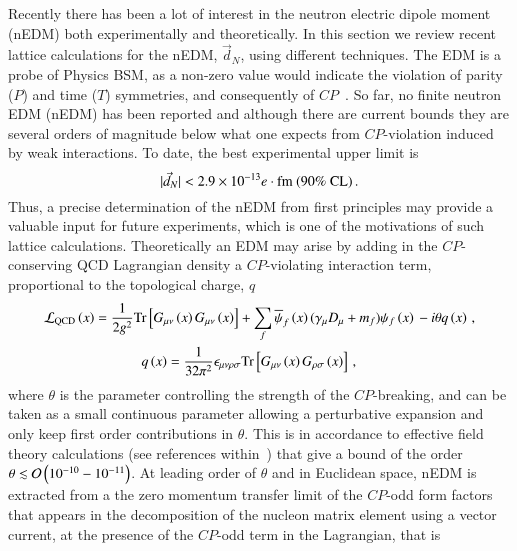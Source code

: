 \documentclass[epj]{webofc}
\newcommand{\be}{\begin{equation}}
\newcommand{\ee}{\end{equation}}
\newcommand{\bea}{\begin{eqnarray}}
\newcommand{\eea}{\end{eqnarray}}
\begin{document}
Recently there has been a lot of interest in the neutron electric dipole moment (nEDM)
both experimentally and theoretically. In this section we review recent lattice calculations for the nEDM,
$\vec{d}_N$, using different techniques. The EDM is a probe of Physics BSM, as a non-zero value would indicate the violation of parity
($P$) and time ($T$) symmetries, and consequently of $CP$~\cite{Pospelov:2005pr}. So far, no finite neutron EDM (nEDM) has been
reported and although there are current bounds they are several orders of magnitude
below what one expects from $CP$-violation induced by weak interactions. To date, the best experimental upper limit 
is~\cite{Helaine:2014ona,Baker:2006ts,Baker:2007df}
\be
\vert \vec{d}_N \vert  < 2.9 \times 10^{-13} e \cdot {\rm fm} \ (90\% \ {\rm CL})\,.
\label{eq:nEDM_smaller_experimental_upperbound}
\ee 
Thus, a precise determination of the nEDM from first principles may provide a valuable input for future experiments, which is one
of the motivations of such lattice calculations. Theoretically an EDM may arise by adding in the $CP$-conserving QCD Lagrangian density 
a $CP$-violating interaction term, proportional to the topological charge, $q$
\bea
  {\cal L}_{\rm QCD} \left( x \right) = \frac{1}{2 g^2} 
{\rm Tr} \left[ G_{\mu \nu} \left( x \right) G_{\mu \nu} \left( x \right) \right] + 
\sum_{f} {\overline \psi}_{f} \left( x \right) (\gamma_{\mu} D_{\mu} +m_f) \psi_{f}\left( x \right)\,
- i \theta q \left( x \right)\,,\\
  q \left( x \right) = \frac{1}{ 32 \pi^2} \epsilon_{\mu \nu \rho \sigma} 
{\rm Tr} \left[ G_{\mu \nu} \left( x \right) G_{\rho \sigma} \left( x \right) \right]\,,\hspace*{3cm}
\eea
where $\theta$ is the parameter controlling the strength of the $CP$-breaking, and can be taken as a small continuous
parameter allowing a perturbative expansion and only keep first order contributions in $\theta$. This is in accordance to effective
field theory calculations (see references within~\cite{Alexandrou:2015spa})
that give a bound of the order 
$\theta \lesssim {\cal O} \left(10^{-10} - 10^{-11} \right)$.
%
At leading order of  $\theta$ and in Euclidean space, nEDM is extracted from a
the zero momentum transfer limit of the $CP$-odd form factors that appears in the
decomposition of the nucleon matrix element using a vector current, at the presence of the
$CP$-odd term in the Lagrangian, that is
\end{document}
